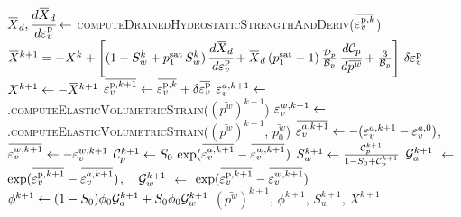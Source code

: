 \begin{breakablealgorithm}
\begin{algorithmic}[1]
      \State $\Xbar_d, \Deriv{\Xbar_d}{\Veps_v^\Tp} \leftarrow$ 
          \textsc{computeDrainedHydrostaticStrengthAndDeriv}($\bar{\Veps_v^{\Tp,k}}$) \WRP
      \State $\Xbar^{k+1} = -X^k + \left[(1 - S_w^k + p_1^\Tsat\,S_w^k)\,\Deriv{\Xbar_d}{\Veps_v^\Tp} +
        \Xbar_d\,(p_1^\Tsat - 1)\,\frac{\CalD_p}{\CalB_p}\,\Deriv{\CalC_p}{\bar{p^w}} + 
        \frac{3}{\CalB_p}\right]\,\delta\Veps_v^\Tp$ \WRP
      \State $X^{k+1} \leftarrow -\Xbar^{k+1}$
      \State $\bar{\Veps_v^{\Tp,k+1}} \leftarrow \bar{\Veps_v^{\Tp,k}} + \delta\bar{\Veps_v^\Tp}$
      \State $\varepsilon_v^{a,k+1} \leftarrow$ 
        .\textsc{computeElasticVolumetricStrain}($(\bar{p^w})^{k+1}$)
      \State $\varepsilon_v^{w,k+1} \leftarrow$ 
        .\textsc{computeElasticVolumetricStrain}($(\bar{p^w})^{k+1}$, $\bar{p^w_0}$)
      \State $\bar{\Veps_v^{a,k+1}} \leftarrow - (\Veps_v^{a,k+1} - \Veps_v^{a,0})$, 
             $\bar{\Veps_v^{w,k+1}} \leftarrow - \Veps_v^{w,k+1}$ 
      \State $\CalC_p^{k+1} \leftarrow S_0\,\exp(\bar{\Veps_v^{a,k+1}} - \bar{\Veps_v^{w,k+1}})$
      \State $S_w^{k+1} \leftarrow \frac{\mathcal{C}_p^{k+1}}{1 - S_0 + \mathcal{C}_p^{k+1}}$ 
      \State $\mathcal{G}_a^{k+1}$ $\leftarrow$ $\exp(\bar{\Veps_v^{\Tp,k+1}} - \bar{\Veps_v^{a,k+1}})$, ~
             $\mathcal{G}_w^{k+1}$ $\leftarrow$ $\exp(\bar{\Veps_v^{\Tp,k+1}} - \bar{\Veps_v^{w,k+1}})$
      \State $\phi^{k+1} \leftarrow 
          (1 - S_0)\phi_0 \mathcal{G}_a^{k+1} + S_0\phi_0 \mathcal{G}_w^{k+1}$ 
      \State \Return $(\bar{p^w})^{k+1}$, $\phi^{k+1}$, $S_w^{k+1}$, $X^{k+1}$
    \EndProcedure
  \end{algorithmic}
\end{breakablealgorithm}

